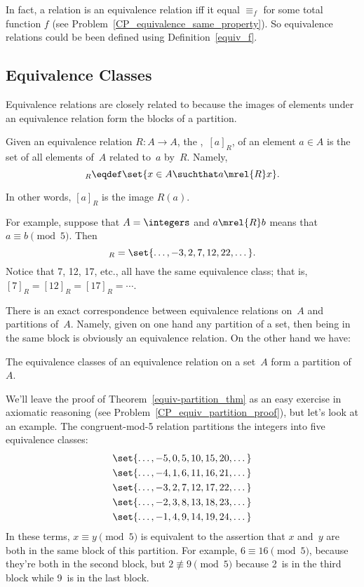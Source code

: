 \begin{definition}
In fact, a relation is an equivalence relation iff it equal $\equiv_f$
for some total function $f$ (see
Problem~\ref{CP_equivalence_same_property}).  So equivalence relations
could be been defined using Definition~\ref{equiv_f}.

\subsection{Equivalence Classes}

Equivalence relations are closely related to  because the
images of elements under an equivalence relation form the blocks of a
partition.

\begin{definition}\label{def:equiv_class}
Given an equivalence relation $R : A \to A$, the ,~$[a]_R$, of an element $a \in A$  is the set of all elements of~$A$
related to~$a$ by~$R$.  Namely,
\begin{equation*}
    [a]_R \eqdef \set{x \in A \suchthat a \mrel{R} x}.
\end{equation*}
\end{definition}
In other words, $[a]_R$ is the image $R(a)$.

For example, suppose that $A = \integers$ and $a \mrel{R} b$ means
that $a \equiv b \pmod{5}$.  Then
\begin{equation*}
    [7]_R = \set{\dots, -3, 2, 7, 12, 22, \dots}.
\end{equation*}
Notice that 7, 12, 17, etc., all have the same equivalence class; that
is, $[7]_R = [12]_R = [17]_R = \cdots$.

There is an exact correspondence between equivalence relations on~$A$
and partitions of~$A$.  Namely, given on one hand any partition of a
set, then being in the same block is obviously an equivalence
relation.  On the other hand we have:
\begin{theorem}\label{equiv-partition_thm}
The equivalence classes of an equivalence relation on a set~$A$ form a
partition of~$A$.
\end{theorem}

We'll leave the proof of Theorem~\ref{equiv-partition_thm} as an easy
exercise in axiomatic reasoning (see
Problem~\ref{CP_equiv_partition_proof}), but let's look at an example.
The congruent-mod-5 relation partitions the integers into five
equivalence classes:
\begin{gather*}
    \set{ \dots, -5, 0, 5, 10, 15, 20, \dots } \\
    \set{ \dots, -4, 1, 6, 11, 16, 21, \dots } \\
    \set{ \dots, -3, 2, 7, 12, 17, 22, \dots } \\
    \set{ \dots, -2, 3, 8, 13, 18, 23, \dots } \\
    \set{ \dots, -1, 4, 9, 14, 19, 24, \dots }
\end{gather*}
In these terms, $x \equiv y \pmod{5}$ is equivalent to the assertion
that $x$ and~$y$ are both in the same block of this partition.  For
example, $6 \equiv 16 \pmod{5}$, because they're both in the second
block, but $2 \not\equiv 9 \pmod{5}$ because 2~is in the third block
while 9~is in the last block.


\end{definition}
